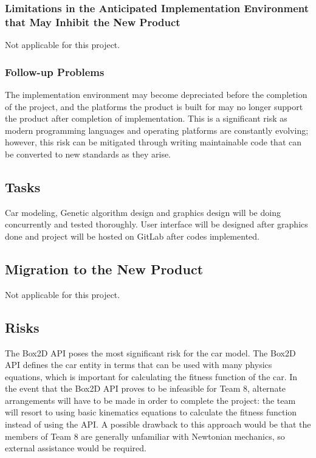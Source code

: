 \documentclass[12pt, titlepage]{article}
\begin{document}
\subsubsection{Limitations in the Anticipated Implementation Environment that 
May Inhibit the New Product}
Not applicable for this project.

\subsubsection{Follow-up Problems}
The implementation environment may become depreciated before the completion of 
the project, and the platforms the product is built for may no longer support 
the product after completion of implementation. This is a significant risk as 
modern programming languages and operating platforms are constantly evolving; 
however, this risk can be mitigated through writing maintainable code that can 
be converted to new standards as they arise.

\subsection{Tasks}
Car modeling, Genetic algorithm design and graphics design will be doing 
concurrently and tested thoroughly. User interface will be designed after 
graphics done and project will be hosted on GitLab after codes implemented.

\subsection{Migration to the New Product}
Not applicable for this project.

\subsection{Risks}
The Box2D API poses the most signiﬁcant risk for the car model. The Box2D 
API deﬁnes the car entity in terms that can be used with many physics 
equations, which is important for calculating the ﬁtness function of the 
car. In the event that the Box2D API proves to be infeasible for Team 8, 
alternate arrangements will have to be made in order to complete the
project: the team will resort to using basic kinematics equations to calculate 
the ﬁtness function instead of using the API. A possible drawback to this 
approach would be that the members of Team 8 are generally unfamiliar with 
Newtonian mechanics, so external assistance would be required. 
\end{document}
